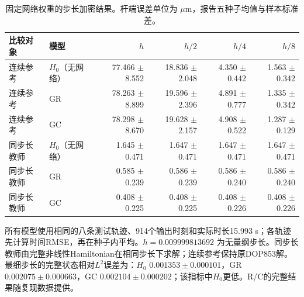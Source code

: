 \begin{table}[t]
\centering
\caption{固定网络权重的步长加密结果。杆端误差单位为 $\mu\mathrm{m}$，报告五种子均值与样本标准差。}
\label{tab:neural_refinement}
\small
\begin{tabular}{llrrrr}
\toprule
比较对象 & 模型 & $h$ & $h/2$ & $h/4$ & $h/8$ \\
\midrule
连续参考 & $H_0$（无网络） & 77.466 $\pm$ 8.552 & 18.836 $\pm$ 2.048 & 4.350 $\pm$ 0.442 & 1.563 $\pm$ 0.342 \\
连续参考 & GR & 78.263 $\pm$ 8.899 & 19.596 $\pm$ 2.396 & 4.891 $\pm$ 0.777 & 1.335 $\pm$ 0.342 \\
连续参考 & GC & 78.298 $\pm$ 8.670 & 19.628 $\pm$ 2.157 & 4.908 $\pm$ 0.522 & 1.287 $\pm$ 0.129 \\
\midrule
同步长教师 & $H_0$（无网络） & 1.645 $\pm$ 0.471 & 1.647 $\pm$ 0.471 & 1.647 $\pm$ 0.471 & 1.647 $\pm$ 0.471 \\
同步长教师 & GR & 0.585 $\pm$ 0.239 & 0.586 $\pm$ 0.239 & 0.586 $\pm$ 0.240 & 0.586 $\pm$ 0.240 \\
同步长教师 & GC & 0.408 $\pm$ 0.225 & 0.408 $\pm$ 0.225 & 0.408 $\pm$ 0.226 & 0.408 $\pm$ 0.226 \\
\bottomrule
\end{tabular}
\par\smallskip\footnotesize 所有模型使用相同的八条测试轨迹、914个输出时刻和实际时长15.993 s；各轨迹先计算时间RMSE，再在种子内平均。$h=0.009999813692$ 为无量纲步长。同步长教师由完整非线性Hamiltonian在相同步长下求解；连续参考保持原DOP853解。最细步长的完整状态相对$L^2$误差为：$H_0$ $0.001353\pm0.000101$，GR $0.002075\pm0.000663$，GC $0.002104\pm0.000202$；该指标中$H_0$更低。R/C的完整结果随复现数据提供。
\end{table}
